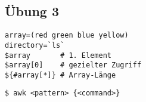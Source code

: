 	\subsection{Übung 3} %
	\label{sub:_ubung_3}
	
		\begin{lstlisting}
array=(red green blue yellow)
directory=`ls`
$array       # 1. Element
$array[0]    # gezielter Zugriff
${#array[*]} # Array-Länge
		\end{lstlisting}

		\lstShell[AWK]
		\begin{lstlisting}
$ awk <pattern> {<command>}
		\end{lstlisting}

